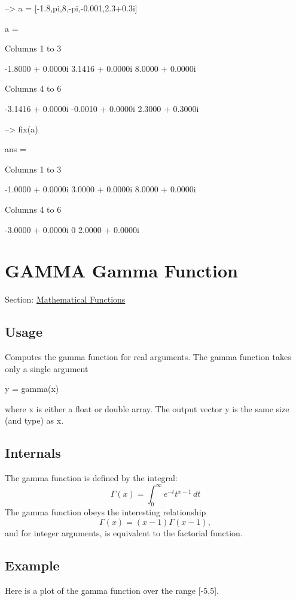 \begin{DoxyVerbInclude}
--> a = [-1.8,pi,8,-pi,-0.001,2.3+0.3i]

a = 

 Columns 1 to 3

  -1.8000 +  0.0000i   3.1416 +  0.0000i   8.0000 +  0.0000i 

 Columns 4 to 6

  -3.1416 +  0.0000i  -0.0010 +  0.0000i   2.3000 +  0.3000i 

--> fix(a)

ans = 

 Columns 1 to 3

  -1.0000 +  0.0000i   3.0000 +  0.0000i   8.0000 +  0.0000i 

 Columns 4 to 6

  -3.0000 +  0.0000i        0             2.0000 +  0.0000i 
\end{DoxyVerbInclude}
 \hypertarget{mathfunctions_gamma}{}\section{G\-A\-M\-M\-A Gamma Function}\label{mathfunctions_gamma}
Section\-: \hyperlink{sec_mathfunctions}{Mathematical Functions} \hypertarget{vtkwidgets_vtkxyplotwidget_Usage}{}\subsection{Usage}\label{vtkwidgets_vtkxyplotwidget_Usage}
Computes the gamma function for real arguments. The {\ttfamily gamma} function takes only a single argument \begin{DoxyVerb}  y = gamma(x)
\end{DoxyVerb}
 where {\ttfamily x} is either a {\ttfamily float} or {\ttfamily double} array. The output vector {\ttfamily y} is the same size (and type) as {\ttfamily x}. \hypertarget{transforms_svd_Function}{}\subsection{Internals}\label{transforms_svd_Function}
The gamma function is defined by the integral\-: \[ \Gamma(x) = \int_{0}^{\infty} e^{-t} t^{x-1} \, dt \] The gamma function obeys the interesting relationship \[ \Gamma(x) = (x-1)\Gamma(x-1), \] and for integer arguments, is equivalent to the factorial function. \hypertarget{variables_struct_Example}{}\subsection{Example}\label{variables_struct_Example}
Here is a plot of the gamma function over the range {\ttfamily \mbox{[}-\/5,5\mbox{]}}.


